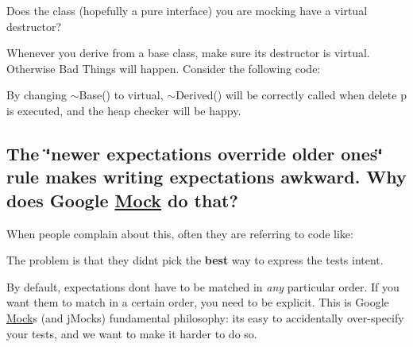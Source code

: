 Does the class (hopefully a pure interface) you are mocking have a virtual destructor?

Whenever you derive from a base class, make sure its destructor is virtual. Otherwise Bad Things will happen. Consider the following code\+:


\begin{DoxyCode}{0}
\DoxyCodeLine{\};}
\DoxyCodeLine{}
\DoxyCodeLine{\};}
\DoxyCodeLine{}
\end{DoxyCode}


By changing {\ttfamily $\sim$\+Base()} to virtual, {\ttfamily $\sim$\+Derived()} will be correctly called when {\ttfamily delete p} is executed, and the heap checker will be happy.

\subsection*{The \char`\"{}newer expectations override older ones\char`\"{} rule makes writing expectations awkward. Why does Google \mbox{\hyperlink{classMock}{Mock}} do that?}

When people complain about this, often they are referring to code like\+:


\begin{DoxyCode}{0}
\end{DoxyCode}


The problem is that they didn\textquotesingle{}t pick the {\bfseries{best}} way to express the test\textquotesingle{}s intent.

By default, expectations don\textquotesingle{}t have to be matched in {\itshape any} particular order. If you want them to match in a certain order, you need to be explicit. This is Google \mbox{\hyperlink{classMock}{Mock}}\textquotesingle{}s (and j\+Mock\textquotesingle{}s) fundamental philosophy\+: it\textquotesingle{}s easy to accidentally over-\/specify your tests, and we want to make it harder to do so.

